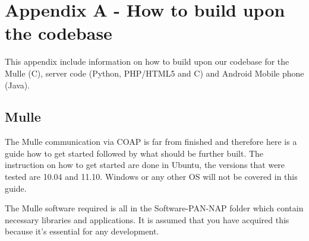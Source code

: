 

\section{Appendix A - How to build upon the codebase}
This appendix include information on how to build upon our codebase for the Mulle (C), server code (Python, PHP/HTML5 and C) and Android Mobile phone (Java).
\subsection{Mulle}
The Mulle communication via COAP is far from finished and therefore here is a guide how to get started followed by what should be further built. The instruction on how to get started are done in Ubuntu, the versions that were tested are 10.04 and 11.10. Windows or any other OS will not be covered in this guide.

The Mulle software required is all in the Software-PAN-NAP folder which contain necessary libraries and applications. It is assumed that you have acquired this because it's essential for any development.

